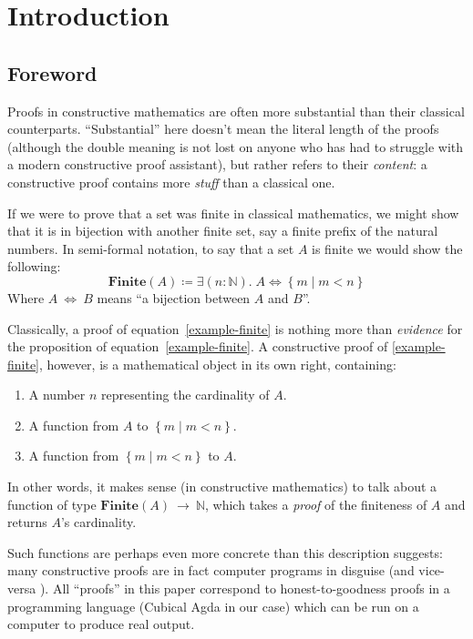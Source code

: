 \section{Introduction}
\subsection{Foreword}
Proofs in constructive mathematics are often more substantial than their
classical counterparts.
``Substantial'' here doesn't mean the literal length of the proofs (although the
double meaning is not lost on anyone who has had to struggle with a modern
constructive proof assistant), but rather refers to their \emph{content}: a
constructive proof contains more \emph{stuff} than a classical one.

If we were to prove that a set was finite in classical mathematics, we might
show that it is in bijection with another finite set, say a finite prefix of the
natural numbers.
In semi-formal notation, to say that a set \(A\) is finite we would show the
following:
\begin{equation} \label{example-finite}
  \mathbf{Finite}(A) \coloneqq \exists (n : \mathbb{N}) . \; A \Leftrightarrow \left\{ m \mid m < n\right\}
\end{equation}
Where \(A~\Leftrightarrow~B\) means ``a bijection between \(A\) and \(B\)''.

Classically, a proof of equation~\ref{example-finite} is nothing more than
\emph{evidence} for the proposition of equation~\ref{example-finite}.
A constructive proof of \ref{example-finite}, however, is a mathematical object
in its own right, containing:
\begin{enumerate}
  \item A number \(n\) representing the cardinality of \(A\).
  \item A function from \(A\) to \(\left\{ m \mid m < n \right\}\).
  \item A function from \(\left\{ m \mid m < n \right\}\) to \(A\).
\end{enumerate}
In other words, it makes sense (in constructive mathematics) to talk about a
function of type \(\mathbf{Finite}(A)~\rightarrow~\mathbb{N}\), which takes a
\emph{proof} of the finiteness of \(A\) and returns \(A\)'s cardinality.

Such functions are perhaps even more concrete than this description suggests:
many constructive proofs are in fact computer programs in disguise (and
vice-versa \cite{wadlerPropositionsTypes2015}).
All ``proofs'' in this paper correspond to honest-to-goodness proofs in a
programming language (Cubical Agda \cite{vezzosiCubicalAgdaDependently2019} in
our case) which can be run on a computer to produce real output.

